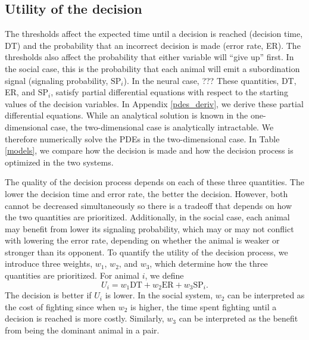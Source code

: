 \documentclass{article}
\begin{document}
\subsection{Utility of the decision }
The thresholds affect the expected time until a decision is reached (decision time, DT) and the probability that an incorrect decision is made (error rate, ER).  The thresholds also affect the probability that either variable will ``give up'' first.  In the social case, this is the probability that each animal will emit a subordination signal (signaling probability, $\text{SP}_i$).  In the neural case, ??? These quantities, DT, ER, and $\text{SP}_i$, satisfy partial differential equations with respect to the starting values of the decision variables. In Appendix \ref{pdes_deriv}, we derive these partial differential equations.  While an analytical solution is known in the one-dimensional case, the two-dimensional case is analytically intractable.  We therefore numerically solve the PDEs in the two-dimensional case.  In Table \ref{models}, we compare how the decision is made and how the decision process is optimized in the two systems.

The quality of the decision process depends on each of these three quantities.  The lower the decision time and error rate, the better the decision.  However, both cannot be decreased simultaneously so there is a tradeoff that depends on how the two quantities are prioritized.  Additionally, in the social case, each animal may benefit from lower its signaling probability, which may or may not conflict with lowering the error rate, depending on whether the animal is weaker or stronger than its opponent.  To quantify the utility of the decision process, we introduce three weights, $w_1$, $w_2$, and $w_3$, which determine how the three quantities are prioritized.  For animal $i$, we define
\begin{equation*}
U_{i}=w_1\text{DT}+w_2\text{ER}+w_3\text{SP}_i.
\end{equation*}
The decision is better if $U_i$ is lower.  In the social system, $w_2$ can be interpreted as the cost of fighting since when $w_2$ is higher, the time spent fighting until a decision is reached is more costly.  Similarly, $w_3$ can be interpreted as the benefit from being the dominant animal in a pair.


\end{document}
